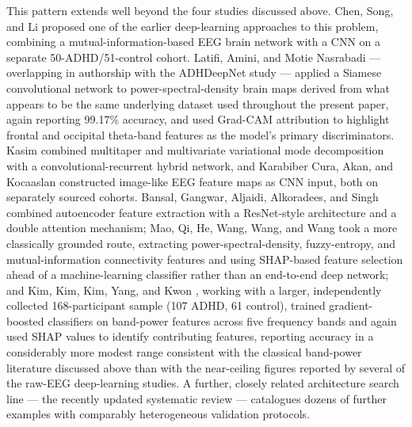 \documentclass[a4paper,fleqn]{cas-sc}
\begin{document}
This pattern extends well beyond the four studies discussed above. Chen, Song, and Li \cite{chen2019deep} proposed one of the earlier deep-learning approaches to this problem, combining a mutual-information-based EEG brain network with a CNN on a separate 50-ADHD/51-control cohort. Latifi, Amini, and Motie Nasrabadi \cite{latifi2024siamese} --- overlapping in authorship with the ADHDeepNet study \cite{amini2025adhdeepnet} --- applied a Siamese convolutional network to power-spectral-density brain maps derived from what appears to be the same underlying dataset used throughout the present paper, again reporting 99.17\% accuracy, and used Grad-CAM attribution to highlight frontal and occipital theta-band features as the model's primary discriminators. Kasim \cite{kasim2023identification} combined multitaper and multivariate variational mode decomposition with a convolutional-recurrent hybrid network, and Karabiber Cura, Akan, and Kocaaslan \cite{cura2024detection} constructed image-like EEG feature maps as CNN input, both on separately sourced cohorts. Bansal, Gangwar, Aljaidi, Alkoradees, and Singh \cite{bansal2025eeg} combined autoencoder feature extraction with a ResNet-style architecture and a double attention mechanism; Mao, Qi, He, Wang, Wang, and Wang \cite{mao2025advanced} took a more classically grounded route, extracting power-spectral-density, fuzzy-entropy, and mutual-information connectivity features and using SHAP-based feature selection ahead of a machine-learning classifier rather than an end-to-end deep network; and Kim, Kim, Kim, Yang, and Kwon \cite{kim2025electroencephalogram}, working with a larger, independently collected 168-participant sample (107 ADHD, 61 control), trained gradient-boosted classifiers on band-power features across five frequency bands and again used SHAP values to identify contributing features, reporting accuracy in a considerably more modest range consistent with the classical band-power literature discussed above \cite{snyder2006metaanalysis,arns2013decade,loo2012clinical} than with the near-ceiling figures reported by several of the raw-EEG deep-learning studies. A further, closely related architecture search line --- the recently updated systematic review \cite{lohani2025systematic} --- catalogues dozens of further examples with comparably heterogeneous validation protocols.
\end{document}
